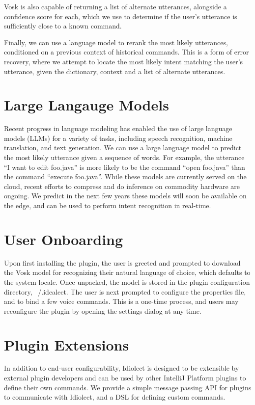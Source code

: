 \documentclass[conference]{IEEEtran}
\begin{document}
Vosk is also capable of returning a list of alternate utterances, alongside a confidence score for each, which we use to determine if the user's utterance is sufficiently close to a known command.

Finally, we can use a language model to rerank the most likely utterances, conditioned on a previous context of historical commands. This is a form of error recovery, where we attempt to locate the most likely intent matching the user's utterance, given the dictionary, context and a list of alternate utterances.

\section{Large Langauge Models}

Recent progress in language modeling has enabled the use of large language models (LLMs) for a variety of tasks, including speech recognition, machine translation, and text generation. We can use a large language model to predict the most likely utterance given a sequence of words. For example, the utterance ``I want to edit foo.java'' is more likely to be the command ``open foo.java'' than the command ``execute foo.java''. While these models are currently served on the cloud, recent efforts to compress and do inference on commodity hardware are ongoing. We predict in the next few years these models will soon be available on the edge, and can be used to perform intent recognition in real-time.

\section{User Onboarding}

Upon first installing the plugin, the user is greeted and prompted to download the Vosk model for recognizing their natural language of choice, which defaults to the system locale. Once unpacked, the model is stored in the plugin configuration directory, ~/.idealect. The user is next prompted to configure the properties file, and to bind a few voice commands. This is a one-time process, and users may reconfigure the plugin by opening the settings dialog at any time.

\section{Plugin Extensions}

In addition to end-user configurability, Idiolect is designed to be extensible by external plugin developers and can be used by other IntelliJ Platform plugins to define their own commands. We provide a simple message passing API for plugins to communicate with Idiolect, and a DSL for defining custom commands.
\end{document}
